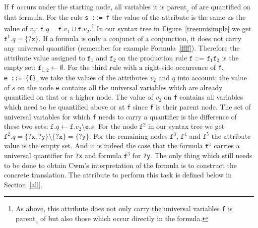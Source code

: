If \texttt{f} occurs under the starting node, all variables it is $\text{parent}_c$ of are quantified on that formula. For the rule \texttt{s ::= f} the value of the attribute is the same 
as the value of $v_2$: $\texttt{f}.q= \texttt{f}.v_1\cup\texttt{f}.v_2$.\footnote{As above, this attribute does not only carry the universal variables \texttt{f} is $\text{parent}_c$ 
of but also those which occur directly in the formula.}   In our syntax tree in Figure~\ref{treeunisimple} we get %
$\texttt{f}^1.q=\{\texttt{?x}\}$.
If a formula is only a conjunct of a conjunction, it does not carry any universal quantifier (remember for example Formula~\ref{ffff}). Therefore the attribute value 
assigned to $\texttt{f}_1$ and $\texttt{f}_2$ on the production rule $\texttt{f ::= f}_1\texttt{f}_2$ is the empty set: $\texttt{f}_{1,2}\leftarrow \emptyset$.
%
For the third rule with a right-side occurrence of \texttt{f}, \texttt{e~::=~\{f\}}, we take the values of the attributes $v_2$ and $q$ into account: the value of $s$ on the
node \texttt{e} contains all the universal variables which are already quantified on that or a higher node. The value of $v_2$ on \texttt{f} contains
all variables which need to be quantified above or at \texttt{f} since \texttt{f} is their parent node. 
The set of universal variables for which \texttt{f} needs to carry a quantifier is
the difference of these two sets: $\texttt{f}.q\leftarrow\texttt{f}.v_2\setminus \texttt{e}.s$.
For the node $\texttt{f}^2$ in our syntax tree we get
$\texttt{f}^2.q=\{\texttt{?x},\texttt{?y}\}\setminus \{\texttt{?x}\}=\{\texttt{?y}\}$. For the remaining nodes $\texttt{f}^3$, $\texttt{f}^4$ and $\texttt{f}^5$
the attribute value is the empty set.
And it is indeed the case that the formula $\texttt{f}^1$ carries a universal quantifier for \texttt{?x} and formula $\texttt{f}^3$ for \texttt{?y}. 
The only thing which still needs to be done to obtain Cwm's interpretation of the formula is to construct the concrete translation. 
The attribute to perform this task is defined below in Section~\ref{all}.

